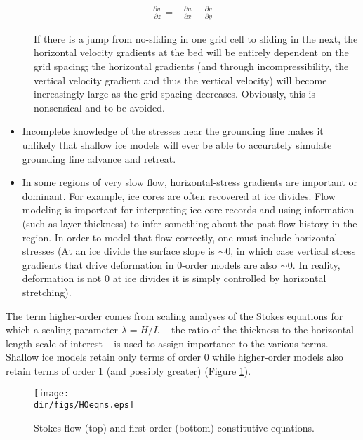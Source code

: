 \begin{align*}
\frac{\partial w}{\partial z} = -\frac{\partial u}{\partial x}-\frac{\partial v}{\partial y}
\end{align*}

\begin{description}
\item[]If there is a jump from no-sliding in one grid cell to sliding in the next, the horizontal velocity gradients at the bed will be entirely dependent on the grid spacing; the horizontal gradients (and through incompressibility, the vertical velocity gradient and thus the vertical velocity) will become increasingly large as the grid spacing decreases. Obviously, this is nonsensical and to be avoided.

\end{description}
\begin{itemize}
\item Incomplete knowledge of the stresses near the grounding line makes it unlikely that shallow ice models will ever be able to accurately simulate grounding line advance and retreat.
\item In some regions of very slow flow, horizontal-stress gradients are important or dominant. For example, ice cores are often recovered at ice divides. Flow modeling is important for interpreting ice core records and using information (such as layer thickness) to infer something about the past flow history in the region. In order to model that flow correctly, one must include horizontal stresses (At an ice divide the surface slope is \(\sim\)0, in which case vertical stress gradients that drive deformation in 0-order models are also \(\sim\)0. In reality, deformation is not 0 at ice divides it is simply controlled by horizontal stretching).
\end{itemize}

The term higher-order comes from scaling analyses of the Stokes equations for which a scaling parameter $\lambda=H/L$ -- the ratio of the thickness to the horizontal length scale of interest -- is used to assign importance to the various terms. Shallow ice models retain only terms of order 0 while higher-order models also retain terms of order 1 (and possibly greater) (Figure \ref{fig:hoeqns}).

\begin{figure}
  \begin{center}
    \texttt{[image: \\dir/figs/HOeqns.eps]}
   \end{center}
  \caption{Stokes-flow (top) and first-order (bottom) constitutive equations.}
  \label{fig:hoeqns}
\end{figure} 

